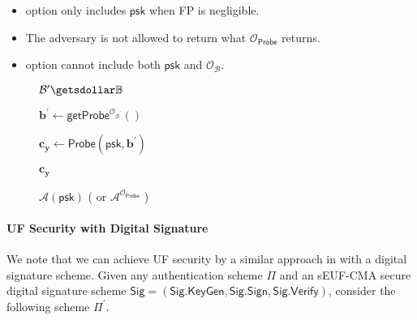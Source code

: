 \begin{itemize}
	\item \textsf{option} only includes $\textsf{psk}$ when \textsf{FP} is negligible.

	\item \label{item:requirement} The adversary is not allowed to return what $\mathcal{O}_\textsf{Probe}$ returns.
	
	\item \textsf{option} cannot include both $\textsf{psk}$ and $\mathcal{O}_{\mathcal{B}}$.
\end{itemize}


\begin{figure}[h]
\centering
	\begin{minipage}[t]{0.6\linewidth}
	\centering
	\begin{algorithm}[H]
	\caption{$\mathcal{A}(\textsf{psk})$ ( or $\mathcal{A}^{\mathcal{O}_\textsf{Probe}}$ ) }
	\label{alg:adv:FP}
	\begin{algorithmic}[1]
		\State $\mathcal{B}^\prime \getsdollar \mathbb{B}$
		
		\State $\mathbf{b}^\prime \gets \textsf{getProbe}^{\mathcal{O}_{\mathcal{B}^\prime }}()$

		\State $\mathbf{c_y} \gets \textsf{Probe}(\textsf{psk}, \mathbf{b}^\prime)$ 

		\State \Return $\mathbf{c_y}$
	\end{algorithmic}
	\end{algorithm}
	\end{minipage}
	
\end{figure}


\paragraph{UF Security with Digital Signature}

We note that we can achieve UF security by a similar approach in \cite{cryptoeprint:2023/481} with a digital signature scheme. Given any authentication scheme $\Pi$ and an sEUF-CMA secure digital signature scheme $\textsf{Sig} = (\textsf{Sig.KeyGen}, \textsf{Sig.Sign}, \textsf{Sig.Verify})$, consider the following scheme $\Pi^\prime$.

